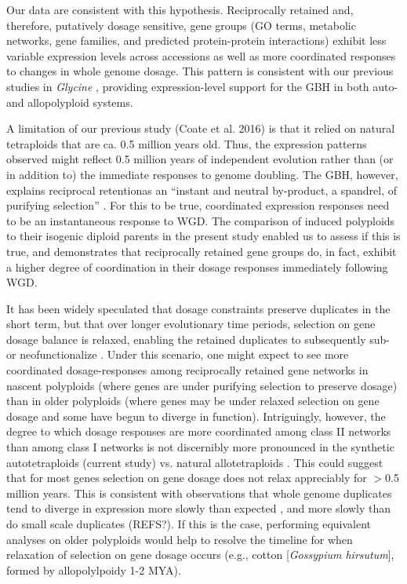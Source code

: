 \documentclass[11pt]{article}
\begin{document}
Our data are consistent with this hypothesis. Reciprocally retained and, therefore, putatively dosage sensitive, gene groups (GO terms, metabolic networks, gene families, and predicted protein-protein interactions) exhibit less variable expression levels across accessions as well as more coordinated responses to changes in whole genome dosage. This pattern is consistent with our previous studies in {\it Glycine} \citep{coate2016}, providing expression-level support for the GBH in both auto- and allopolyploid systems. 

A limitation of our previous study (Coate et al. 2016) is that it relied on natural tetraploids that are ca. 0.5 million years old. Thus, the expression patterns observed might reflect 0.5 million years of independent evolution rather than (or in addition to) the immediate responses to genome doubling. The GBH, however, explains  reciprocal retentionas an ``instant and neutral by-product, a spandrel, of purifying selection'' \citep{freeling2009}. For this to be true, coordinated expression responses need to be an instantaneous response to WGD. The comparison of induced polyploids to their isogenic diploid parents in the present study enabled us to assess if this is true, and demonstrates that reciprocally retained gene groups do, in fact, exhibit a higher degree of coordination in their dosage responses immediately following WGD. 

It has been widely speculated that dosage constraints preserve duplicates in the short term, but that over longer evolutionary time periods, selection on gene dosage balance is relaxed, enabling the retained duplicates to subsequently sub- or neofunctionalize \citep{coate2011, schnable2012, conant2014, coate2016}. Under this scenario, one might expect to see more coordinated dosage-responses among reciprocally retained gene networks in nascent polyploids (where genes are under purifying selection to preserve dosage) than in older polyploids (where genes may be under relaxed selection on gene dosage and some have begun to diverge in function). Intriguingly, however, the degree to which dosage responses are more coordinated among class II networks than among class I networks is not discernibly more pronounced in the synthetic autotetraploids (current study) vs. natural allotetraploids \citep{coate2016}. This could suggest that for most genes selection on gene dosage does not relax appreciably for $>$0.5 million years. This is consistent with observations that whole genome duplicates tend to diverge in expression more slowly than expected \citep{rodgers2012, tasdighian2017}, and more slowly than do small scale duplicates (REFS?). If this is the case, performing equivalent analyses on older polyploids would help to resolve the timeline for when relaxation of selection on gene dosage occurs (e.g., cotton [{\it Gossypium hirsutum}], formed by allopolylpoidy 1-2 MYA).
\end{document}
